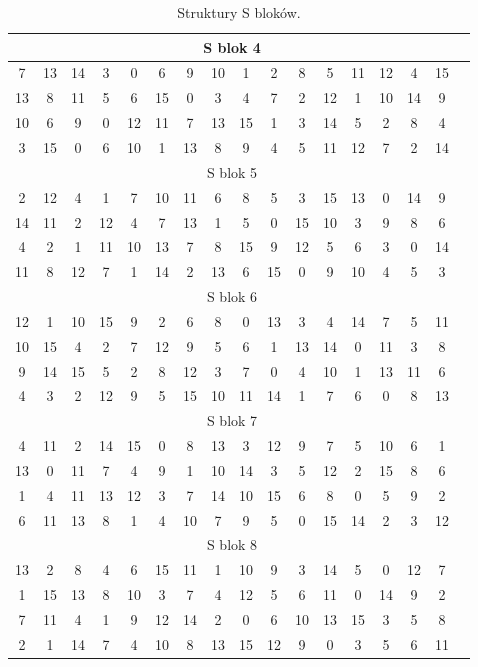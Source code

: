 \documentclass[12p]{article}
\begin{document}
\begin{table}[H]
\begin{tabular}{|c|c|c|c|c|c|c|c|c|c|c|c|c|c|c|c|c|}
\multicolumn{16}{|c|}{S blok 4}\\ \hline
7 &	13 &	14 &	3 &	0 &	6 &	9 &	10 &	1 &	2& 	8& 	5& 	11& 	12& 	4& 	15\\ \hline
13& 	8& 	11& 	5& 	6& 	15& 	0& 	3& 	4& 	7& 	2& 	12& 	1& 	10& 	14& 	9\\ \hline
10& 	6& 	9& 	0& 	12& 	11& 	7& 	13& 	15& 	1& 	3& 	14& 	5& 	2& 	8& 	4\\ \hline
3& 	15& 	0& 	6& 	10& 	1& 	13& 	8& 	9& 	4& 	5& 	11& 	12& 	7& 	2& 	14\\ \hline
\multicolumn{16}{|c|}{S blok 5}\\ \hline
2& 	12& 	4& 	1& 	7& 	10& 	11& 	6& 	8& 	5& 	3& 	15& 	13& 	0& 	14& 	9\\ \hline
14& 	11& 	2& 	12& 	4& 	7& 	13& 	1& 	5& 	0& 	15& 	10& 	3& 	9& 	8& 	6\\ \hline
4& 	2& 	1& 	11& 	10& 	13& 	7& 	8& 	15& 	9& 	12& 	5& 	6& 	3& 	0& 	14\\ \hline
11& 	8& 	12& 	7& 	1& 	14& 	2& 	13& 	6& 	15& 	0& 	9& 	10& 	4& 	5& 	3\\ \hline 
\multicolumn{16}{|c|}{S blok 6}\\ \hline
12& 	1& 	10& 	15& 	9& 	2& 	6& 	8& 	0& 	13& 	3& 	4& 	14& 	7& 	5& 	11\\ \hline
10 &	15& 	4& 	2& 	7& 	12& 	9& 	5& 	6& 	1& 	13& 	14& 	0& 	11& 	3& 	8\\ \hline
9& 	14& 	15& 	5& 	2& 	8& 	12& 	3& 	7& 	0& 	4& 	10& 	1& 	13& 	11& 	6\\ \hline
4& 	3& 	2& 	12& 	9& 	5& 	15& 	10& 	11& 	14& 	1& 	7& 	6& 	0& 	8& 	13\\ \hline
\multicolumn{16}{|c|}{S blok 7}\\ \hline
4& 	11& 	2& 	14& 	15& 	0& 	8& 	13& 	3& 	12& 	9& 	7& 	5& 	10& 	6& 	1\\ \hline
13& 	0& 	11& 	7& 	4& 	9& 	1& 	10& 	14& 	3& 	5& 	12& 	2& 	15& 	8& 	6\\ \hline
1& 	4& 	11& 	13& 	12& 	3& 	7& 	14& 	10& 	15& 	6& 	8& 	0& 	5& 	9& 	2\\ \hline
6& 	11& 	13& 	8& 	1& 	4& 	10& 	7& 	9& 	5& 	0& 	15& 	14& 	2& 	3& 	12\\ \hline 
\multicolumn{16}{|c|}{S blok 8}\\ \hline
13& 	2& 	8& 	4& 	6& 	15& 	11& 	1& 	10& 	9& 	3& 	14& 	5& 	0& 	12& 	7\\ \hline
1& 	15& 	13& 	8& 	10& 	3& 	7& 	4& 	12& 	5& 	6& 	11& 	0& 	14& 	9& 	2\\ \hline
7& 	11& 	4& 	1& 	9& 	12& 	14& 	2& 	0& 	6& 	10& 	13& 	15& 	3& 	5& 	8\\ \hline
2& 	1& 	14& 	7& 	4& 	10& 	8& 	13& 	15& 	12& 	9& 	0& 	3& 	5& 	6& 	11 \\ \hline
\end{tabular}
\caption{Struktury S bloków.}\label{s_bloki}
\end{table}
\end{document}
